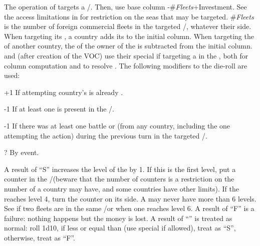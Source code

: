  The operation of 
targets a \STZ/\CTZ. Then, use base column
\FTI-\#\emph{Fleets}+Investment.%
\bparag See the access limitations in  for
restriction on the seas that may be targeted.
\bparag \#\emph{Fleets} is the number of foreign commercial fleets in the
targeted \STZ/\CTZ, whatever their side.
\bparag When targeting its \CTZ, a country adds its \DTI to the initial
column.
\bparag When targeting the \CTZ of another country, the \DTI of the owner of
the \CTZ is subtracted from the initial column.
\bparag \POR and \HOL (after creation of the VOC) use their special \FTI if
targeting a \STZ in the \ROTW, both for column computation and to resolve
\undemi.
\bparag The following modifiers to the die-roll are used:
\begin{modlist}
\item[+1]If attempting country's \TradeFLEET is already \Faceplus.
\item[-1]If at least one  \corsaire is present in the \STZ/\CTZ.
\item[-1]If there was at least one battle or \corsaire (from any country,
  including the one attempting the action) during the previous turn in the
  targeted \STZ/\CTZ.
\item[\textplusminus?]By event.
\end{modlist}

\bparag A result of ``S'' increases the level of the \TradeFLEET by 1. If this
is the first level, put a counter in the \STZ/\CTZ (beware that the number of
counters is a restriction on the number of \TradeFLEET a country may have, and
some countries have other limits). If the \TradeFLEET reaches level 4, turn
the counter on its \Faceplus side. A \TradeFLEET may never have more than 6
levels.
\bparag See  if two fleets are
\Faceplus in the same \STZ/\CTZ or when one \TradeFLEET reaches level 6.
\bparag A result of ``F'' is a failure: nothing happens but the money is lost.
\bparag A result of ``\undemi'' is treated as normal: roll 1d10, if less or
equal than \FTI (use special \FTI if allowed), treat as ``S'', otherwise,
treat as ``F''.

